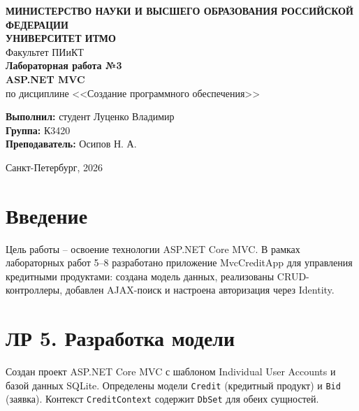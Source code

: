 \documentclass[14pt,a4paper]{extarticle}
\begin{document}
\thispagestyle{empty}
\begin{center}
\textbf{МИНИСТЕРСТВО НАУКИ И ВЫСШЕГО ОБРАЗОВАНИЯ РОССИЙСКОЙ ФЕДЕРАЦИИ}\\[0.3cm]
\textbf{УНИВЕРСИТЕТ ИТМО}\\[0.5cm]
Факультет ПИиКТ\\[1.5cm]

\textbf{\Large Лабораторная работа №3}\\[0.5cm]
\textbf{\large ASP.NET MVC}\\[0.5cm]
по дисциплине <<Создание программного обеспечения>>\\[2cm]
\end{center}

\begin{flushleft}
\hspace{1.25cm}\begin{minipage}[t]{\dimexpr\textwidth-1.25cm\relax}
\textbf{Выполнил:} студент Луценко Владимир\\
\textbf{Группа:} К3420\\
\textbf{Преподаватель:} Осипов Н. А.\\
\end{minipage}
\end{flushleft}

\vfill
\begin{center}
Санкт-Петербург, 2026
\end{center}
\newpage

\tableofcontents
\newpage

\section{Введение}

Цель работы -- освоение технологии ASP.NET Core MVC. В рамках лабораторных работ 5--8 разработано приложение MvcCreditApp для управления кредитными продуктами: создана модель данных, реализованы CRUD-контроллеры, добавлен AJAX-поиск и настроена авторизация через Identity.

\section{ЛР 5. Разработка модели}

Создан проект ASP.NET Core MVC с шаблоном Individual User Accounts и базой данных SQLite. Определены модели \texttt{Credit} (кредитный продукт) и \texttt{Bid} (заявка). Контекст \texttt{CreditContext} содержит \texttt{DbSet} для обеих сущностей.
\end{document}
